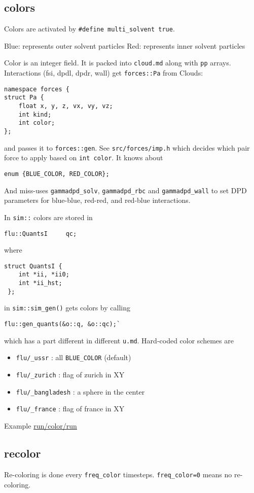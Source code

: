 \subsection{colors}\label{colors}

Colors are activated by \texttt{\#define\ multi\_solvent\ true}.

Blue: represents outer solvent particles Red: represents inner solvent
particles

Color is an integer field. It is packed into \texttt{cloud.md} along
with \texttt{pp} arrays. Interactions (fsi, dpdl, dpdr, wall) get
\texttt{forces::Pa} from Clouds:

\begin{verbatim}
namespace forces {
struct Pa {
    float x, y, z, vx, vy, vz;
    int kind;
    int color;
};
\end{verbatim}

and passes it to \texttt{forces::gen}. See \texttt{src/forces/imp.h} which
decides which pair force to apply based on \texttt{int\ color}. It knows
about

\begin{verbatim}
enum {BLUE_COLOR, RED_COLOR};
\end{verbatim}

And miss-uses \texttt{gammadpd\_solv}, \texttt{gammadpd\_rbc} and
\texttt{gammadpd\_wall} to set DPD parameters for blue-blue, red-red,
and red-blue interactions.

In \texttt{sim::} colors are stored in

\begin{verbatim}
flu::QuantsI     qc;
\end{verbatim}

where

\begin{verbatim}
struct QuantsI {
    int *ii, *ii0;
    int *ii_hst;
 };
\end{verbatim}

in \texttt{sim::sim\_gen()} gets colors by calling

\begin{verbatim}
flu::gen_quants(&o::q, &o::qc);`
\end{verbatim}

which has a part different in different \texttt{u.md}. Hard-coded
color schemes are

\begin{itemize}
\tightlist
\item
  \texttt{flu/\_ussr} : all \texttt{BLUE\_COLOR} (default)
\item
  \texttt{flu/\_zurich} : flag of zurich in XY
\item
  \texttt{flu/\_bangladesh} : a sphere in the center
\item
  \texttt{flu/\_france} : flag of france in XY
\end{itemize}

Example \url{run/color/run}

\subsection{recolor}\label{recolor}

Re-coloring is done every \texttt{freq\_color} timesteps.
\texttt{freq\_color=0} means no re-coloring.
